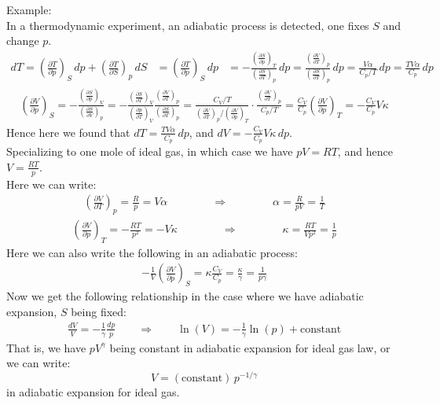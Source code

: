 \documentclass[11pt,oneside]{book}
\theoremstyle{break}
\theoremstyle{break}
\newcommand{\pd}{\partial}
\newcommand{\lr}[1]{\left( #1 \right)}
\newcommand{\example}{\color{green}Example: \color{black}}
\begin{document}
\example\\
In a thermodynamic experiment, an adiabatic process is detected, one fixes $S$ and change $p$. 
\begin{align*}
dT = \lr{\frac{\pd T}{\pd p}}_S \, dp + \lr{\frac{\pd T}{\pd S}}_p \, dS &= \lr{\frac{\pd T}{\pd p}}_S \, dp
&= -\frac{\lr{\frac{\pd S}{\pd p}}_T}{\lr{\frac{\pd S}{\pd T}}_p}\, dp =  \frac{\lr{\frac{\pd V}{\pd T}}_p}{\lr{\frac{\pd S}{\pd T}}_p}\, dp = \frac{V\alpha}{C_p/T}\,dp = \frac{TV\alpha}{C_p} \, dp
\end{align*}
\begin{align*}
\lr{\frac{\pd V}{\pd p}}_S = -\frac{\lr{\frac{\pd S}{\pd p}}_V}{\lr{\frac{\pd S}{\pd V}}_p} = -\frac{\lr{\frac{\pd S}{\pd T}}_V}{\lr{\frac{\pd p}{\pd T}}_V}\frac{\lr{\frac{\pd V}{\pd T}}_p}{\lr{\frac{\pd S}{\pd T}}_p} = \frac{C_V/T}{\lr{\frac{\pd V}{\pd T}}_p /\lr{\frac{\pd V}{\pd p}}_T} \cdot \frac{\lr{\frac{\pd V}{\pd T}}_p}{C_p / T} = \frac{C_V}{C_p}\lr{\frac{\pd V}{\pd p}}_T = -\frac{C_V}{C_p}V\kappa
\end{align*}
Hence here we found that $dT = \frac{TV\alpha}{C_p}\, dp$, and $dV = -\frac{C_V}{C_p}V\kappa \, dp$.\\



Specializing to one mole of ideal gas, in which case we have $pV = RT$, and hence $V = \frac{RT}{p}$. \\
Here we can write:
\begin{align*}
\lr{\frac{\pd V}{\pd T}}_p = \frac{R}{p} = V\alpha \qquad \qquad \Rightarrow \qquad\qquad \alpha = \frac{R}{pV} = \frac{1}{T}
\end{align*}
\begin{align*}
\lr{\frac{\pd V}{\pd p}}_T = -\frac{RT}{p^2} = -V\kappa \qquad \qquad \Rightarrow\qquad \qquad \kappa = \frac{RT}{Vp^2}= \frac{1}{p}
\end{align*}
Here we can also write the following in an adiabatic process:
\begin{align*}
-\frac{1}{V}\lr{\frac{\pd V}{\pd p}}_S = \kappa \frac{C_V}{C_p} = \frac{\kappa }{\gamma} = \frac{1}{p\gamma}
\end{align*}
Now we get the following relationship in the case where we have adiabatic expansion, $S$ being fixed:
\begin{align*}
\frac{dV}{V} = - \frac{1}{\gamma} \frac{dp}{p} \qquad \Rightarrow \qquad \ln(V) = -\frac{1}{\gamma} \ln (p) + \text{constant}
\end{align*}
That is, we have $pV^{\gamma}$ being constant in adiabatic expansion for ideal gas law, or we can write: 
$$V = (\text{constant})\, p^{-1/\gamma}$$
in adiabatic expansion for ideal gas.\\
\end{document}
